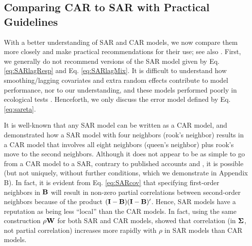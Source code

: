 \documentclass[11pt, titlepage]{article}\usepackage[]{graphicx}\usepackage[]{color}
\begin{document}
\begin{spacing}{1.9}
\begin{flushleft}
\subsection*{Comparing CAR to SAR with Practical Guidelines}

With a better understanding of SAR and CAR models, we now compare them more closely and make practical recommendations for their use; see also \citet{Wall:clos:2004}. First, we generally do not recommend versions of the SAR model given by Eq. \ref{eq:SARlagResp} and Eq. \ref{eq:SARlagMix}.  It is difficult to understand how smoothing/lagging covariates and extra random effects contribute to model performance, nor to our understanding, and these models performed poorly in ecological tests \citep{Dorm:etal:meth:2007, Kiss:Carl:spat:2008}. Henceforth, we only discuss the error model defined by Eq. \ref{eq:sareta}. 

It is well-known that any SAR model can be written as a CAR model, and \citet[pg. 408]{Cres:stat:1993} demonstrated how a SAR model with four neighbors (rook's neighbor) results in a CAR model that involves all eight neighbors (queen's neighbor) plus rook's move to the second neighbors.  Although it does not appear to be as simple to go from a CAR model to a SAR, contrary to published accounts \citep[pg. 408]{Cres:stat:1993} and \citep[pg. 86]{Bane:Carl:Gelf:hier:2014}, it is possible (but not uniquely, without further conditions, which we demonstrate in Appendix B). In fact, it is evident from Eq. \ref{eq:SARcov} that specifying first-order neighbors in $\mathbf{B}$ will result in non-zero partial correlations between second-order neighbors because of the product $(\mathbf{I} - \mathbf{B})(\mathbf{I} - \mathbf{B})^{\prime}$.  Hence, SAR models have a reputation as being less ``local'' than the CAR models.  In fact, using the same construction $\rho\mathbf{W}$ for both SAR and CAR models, \citet{Wall:clos:2004} showed that correlation (in $\mbox{\boldmath $\Sigma$}$, not partial correlation) increases more rapidly with $\rho$ in SAR models than CAR models. 


\end{flushleft}
\end{spacing}
\end{document}

